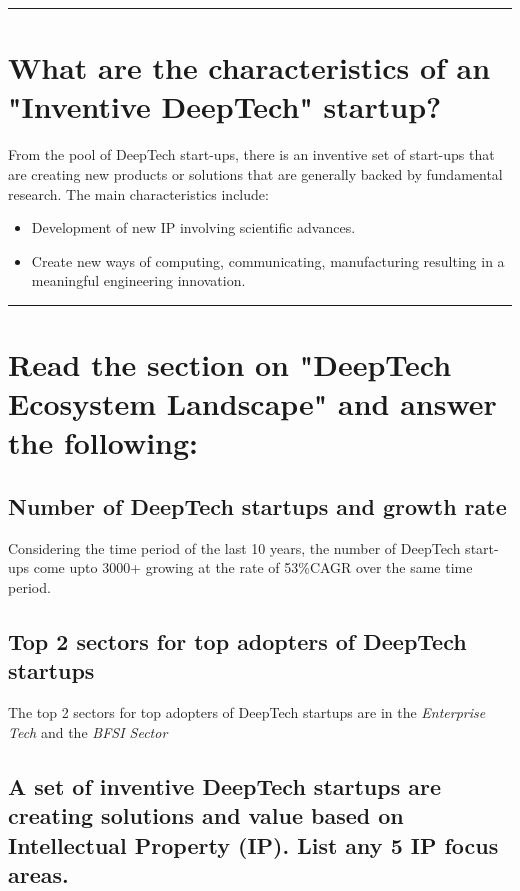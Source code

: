 \documentclass[a4paper]{article}
\begin{document}
\rule{\textwidth}{0.4pt}

\section{What are the characteristics of an "Inventive DeepTech" startup?}

\large{From the pool of DeepTech start-ups, there is an inventive set of start-ups that are creating new products or solutions that are generally backed by fundamental research.
The main characteristics include:
\begin{itemize}
    \item Development of new IP involving scientific advances.
    \item Create new ways of computing, communicating, manufacturing resulting in a meaningful engineering innovation.
\end{itemize}
}

\rule{\textwidth}{0.4pt}

\newpage

\section{Read the section on "DeepTech Ecosystem Landscape" and answer the following:}

\subsection{Number of DeepTech startups and growth rate}

\large{Considering the time period of the last 10 years, the number of DeepTech start-ups come upto 3000+ growing at the rate of 53\%CAGR over the same time period.
}

\subsection{Top 2 sectors for top adopters of DeepTech startups}

\large {The top 2 sectors for top adopters of DeepTech startups are in the \textit{Enterprise Tech} and the \textit{BFSI Sector}
}

\subsection{A set of inventive DeepTech startups are creating solutions and value based on Intellectual Property (IP). List any 5 IP focus areas.}
\end{document}
